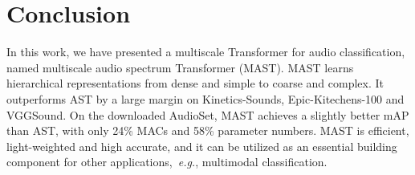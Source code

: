 \documentclass{article}
\def\eg{\emph{e.g.}}
\begin{document}
\section{Conclusion}
\label{sec:conclusion}
In this work, we have presented a multiscale Transformer for audio classification, named multiscale audio spectrum Transformer (MAST). MAST learns hierarchical representations from dense and simple to coarse and complex. It outperforms AST by a large margin on Kinetics-Sounds, Epic-Kitechens-100 and VGGSound. On the downloaded AudioSet, MAST achieves a slightly better mAP than AST, with only 24\% MACs and 58\% parameter numbers. MAST is efficient, light-weighted and high accurate, and it can be utilized as an essential building component for other applications,~\eg, multimodal classification.










































































{\small

}
\end{document}
